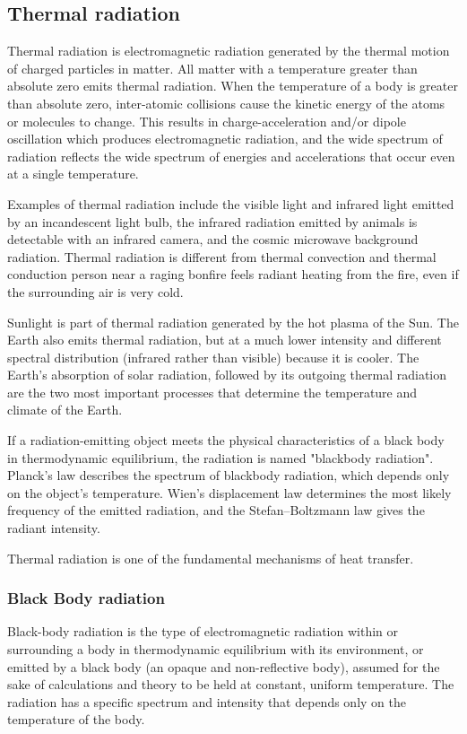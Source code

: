 	\subsection{Thermal radiation}
	Thermal radiation is electromagnetic radiation generated by the thermal motion of charged particles in matter. All matter with a temperature greater than absolute zero emits thermal radiation. When the temperature of a body is greater than absolute zero, inter-atomic collisions cause the kinetic energy of the atoms or molecules to change. This results in charge-acceleration and/or dipole oscillation which produces electromagnetic radiation, and the wide spectrum of radiation reflects the wide spectrum of energies and accelerations that occur even at a single temperature.
	
	Examples of thermal radiation include the visible light and infrared light emitted by an incandescent light bulb, the infrared radiation emitted by animals is detectable with an infrared camera, and the cosmic microwave background radiation. Thermal radiation is different from thermal convection and thermal conduction person near a raging bonfire feels radiant heating from the fire, even if the surrounding air is very cold.
	
	Sunlight is part of thermal radiation generated by the hot plasma of the Sun. The Earth also emits thermal radiation, but at a much lower intensity and different spectral distribution (infrared rather than visible) because it is cooler. The Earth's absorption of solar radiation, followed by its outgoing thermal radiation are the two most important processes that determine the temperature and climate of the Earth.
	
	If a radiation-emitting object meets the physical characteristics of a black body in thermodynamic equilibrium, the radiation is named "blackbody radiation". Planck's law describes the spectrum of blackbody radiation, which depends only on the object's temperature. Wien's displacement law determines the most likely frequency of the emitted radiation, and the Stefan–Boltzmann law gives the radiant intensity.
	
	Thermal radiation is one of the fundamental mechanisms of heat transfer.
	
	\subsubsection{Black Body radiation}
	Black-body radiation is the type of electromagnetic radiation within or surrounding a body in thermodynamic equilibrium with its environment, or emitted by a black body (an opaque and non-reflective body), assumed for the sake of calculations and theory to be held at constant, uniform temperature. The radiation has a specific spectrum and intensity that depends only on the temperature of the body.
	
